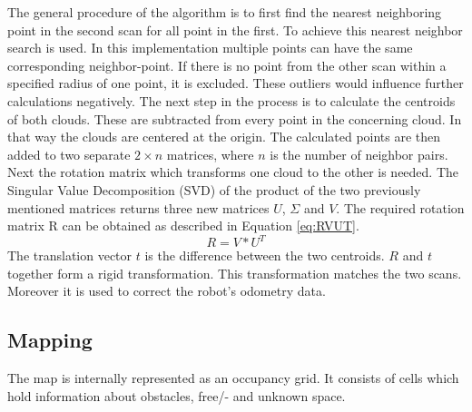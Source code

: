 \documentclass{ba-kecs}
\begin{document}
The general procedure of the algorithm is to first find the nearest neighboring point in the second scan for all point in the first. To achieve this nearest neighbor search is used.
In this implementation multiple points can have the same corresponding neighbor-point. If there is no point from the other scan within a specified radius of one point, it is excluded. These outliers would influence further calculations negatively.
The next step in the process is to calculate the centroids of both clouds. These are subtracted from every point in the concerning cloud. In that way the clouds are centered at the origin. The calculated points are then added to two separate $2 \times n$ matrices, where $n$ is the number of neighbor pairs. Next the rotation matrix which transforms one cloud to the other is needed. The Singular Value Decomposition (SVD) of the product of the two previously mentioned matrices returns three new matrices $U$, $\Sigma$ and $V$. The required rotation matrix R can be obtained as described in Equation \ref{eq:RVUT}.
\begin{equation}
\label{eq:RVUT}
 R = V * U^T
\end{equation}
The translation vector $t$ is the difference between the two centroids. $R$ and $t$ together form a rigid transformation. This transformation matches the two scans. Moreover it is used to correct the robot's odometry data.

\subsection{Mapping}\label{sec:mapping}

The map is internally represented as an occupancy grid. It consists of cells which hold information about obstacles, free/- and unknown space. 
\end{document}
